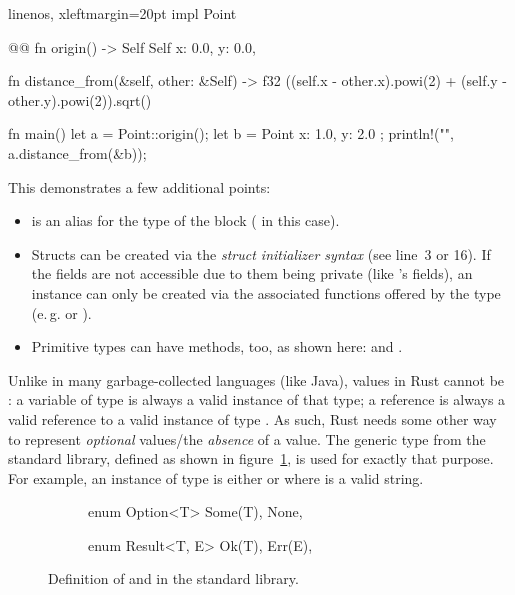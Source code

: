 \begin{rustcode*}{linenos, xleftmargin=20pt}
impl Point { @@
    fn origin() -> Self {
        Self {
            x: 0.0,
            y: 0.0,
        }
    }

    fn distance_from(&self, other: &Self) -> f32 {
        ((self.x - other.x).powi(2) + (self.y - other.y).powi(2)).sqrt()
    }
}

fn main() {
    let a = Point::origin();
    let b = Point { x: 1.0, y: 2.0 };
    println!("{}", a.distance_from(&b));
}
\end{rustcode*}

This demonstrates a few additional points:

\vspace{-3mm}
\begin{itemize}
  \item {} is an alias for the type of the  block ( in this case).
  \item Structs can be created via the \emph{struct initializer syntax} (see line~3 or 16).
  If the fields are not accessible due to them being private (like 's fields), an instance can only be created via the associated functions offered by the type (e.\,g.  or ).
  \item Primitive types can have methods, too, as shown here:  and .
\end{itemize}

Unlike in many garbage-collected languages (like Java), values in Rust cannot be :
a variable of type  is always a valid instance of that type; a reference  is always a valid reference to a valid instance of type .
As such, Rust needs some other way to represent \emph{optional} values/the \emph{absence} of a value.
The generic type  from the standard library, defined as shown in figure~\ref{fig:option-result-def}, is used for exactly that purpose.
For example, an instance of type  is either  or  where  is a valid string.

\begin{figure}[b]
\centering
\begin{subfigure}{.4\textwidth}
\begin{rustcode}
enum Option<T> {
    Some(T),
    None,
}
\end{rustcode}
\end{subfigure}
\begin{subfigure}{.4\textwidth}
\begin{rustcode}
enum Result<T, E> {
    Ok(T),
    Err(E),
}
\end{rustcode}
\end{subfigure}
\caption{Definition of  and  in the standard library.}
\label{fig:option-result-def}
\end{figure}

